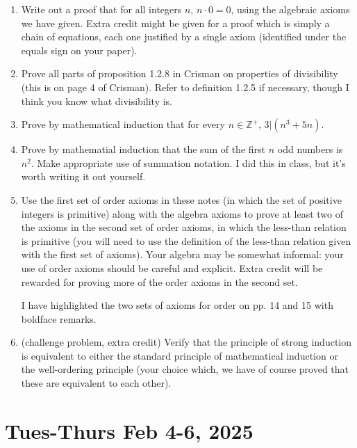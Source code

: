 \documentclass[12pt]{article}
\begin{document}
\begin{enumerate}

\item  Write out a proof that for all integers $n$, $n \cdot 0 = 0$, using the algebraic axioms we have given.  Extra credit might be given for a proof which is simply a chain of equations, each one justified by a single axiom (identified under the equals sign on your paper).

\item  Prove all parts of proposition 1.2.8 in Crisman on properties of divisibility (this is on page 4 of Crisman).  Refer to definition 1.2.5 if necessary, though I think you know what divisibility is.

\item  Prove by mathematical induction that for every $n \in {\mathbb Z}^+$, $3|(n^3+5n)$.

\item  Prove by mathematial induction that the sum of the first $n$ odd numbers is $n^2$.  Make appropriate use of summation notation.  I did this in class, but it's worth writing it out yourself.

\item Use the first set of order axioms in these notes (in which the set of positive integers is primitive) along with the algebra axioms to prove at least two of the axioms in the second set of order axioms, in which the less-than relation is primitive (you will need to use the definition of the less-than relation given with the first set of axioms).  Your algebra may be somewhat informal:  your use of order axioms should be careful and explicit.  Extra credit will be rewarded for proving more of the order axioms in the second set.

I have highlighted the two sets of axioms for order on pp. 14 and 15 with boldface remarks.

\item (challenge problem, extra credit)  Verify that the principle of strong induction is equivalent to either the standard principle of mathematical induction or the well-ordering principle (your choice which, we have of course proved that these are equivalent to each other).

\end{enumerate}

\section{Tues-Thurs Feb 4-6, 2025}
\end{document}
